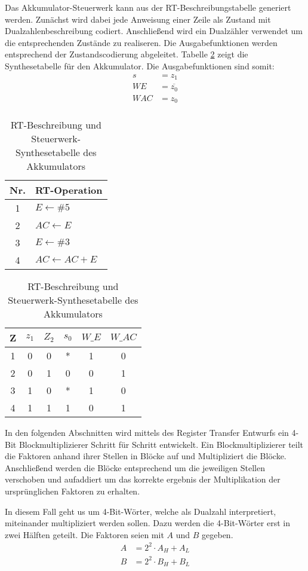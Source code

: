 Das Akkumulator-Steuerwerk kann aus der RT-Beschreibungstabelle generiert werden. Zunächst wird dabei jede Anweisung einer Zeile als Zustand mit Dualzahlenbeschreibung codiert. Anschließend wird ein Dualzähler verwendet um die entsprechenden Zustände zu realiseren. Die Ausgabefunktionen werden entsprechend der Zustandscodierung abgeleitet. Tabelle \ref{AkkuSteuerwerkSynthese} zeigt die Synthesetabelle für den Akkumulator. Die Ausgabefunktionen sind somit:
\begin{align*}
	s &= z_1 \\
	WE &= \overline{z_0} \\
	WAC &= z_0 \\
\end{align*}

\begin{table}[htp]
\centering
\begin{tabular}{cl}
Nr. & RT-Operation\\\hline
1 & $E \leftarrow \#5$\\
2 & $AC \leftarrow E$\\
3 & $E \leftarrow \#3$\\
4 & $AC \leftarrow AC + E$\\
\end{tabular}
\hspace{0.7cm}
\begin{tabular}{c|cc|ccc}
Z & $z_1$ & $Z_2$ & $s_0$ & $W\_E$ & $W\_AC$ \\ \hline
1 & 0     & 0     & *     & 1      & 0       \\
2 & 0     & 1     & 0     & 0      & 1       \\
3 & 1     & 0     & *     & 1      & 0       \\
4 & 1     & 1     & 1     & 0      & 1       \\
\end{tabular}
\caption{RT-Beschreibung und Steuerwerk-Synthesetabelle des Akkumulators}
\label{AkkuSteuerwerkSynthese}
\end{table}

In den folgenden Abschnitten wird mittels des Register Transfer Entwurfs ein 4-Bit Blockmultiplizierer Schritt für Schritt entwickelt. Ein Blockmultiplizierer teilt die Faktoren anhand ihrer Stellen in Blöcke auf und Multipliziert die Blöcke. Anschließend werden die Blöcke entsprechend um die jeweiligen Stellen verschoben und aufaddiert um das korrekte ergebnis der Multiplikation der ursprünglichen Faktoren zu erhalten.

In diesem Fall geht us um 4-Bit-Wörter, welche als Dualzahl interpretiert, miteinander multipliziert werden sollen. Dazu werden die 4-Bit-Wörter erst in zwei Hälften geteilt. Die Faktoren seien mit $A$ und $B$ gegeben.
\begin{align*}
	A &= 2^2 \cdot A_H + A_L \\
	B &= 2^2 \cdot B_H + B_L \\	
\end{align*}

